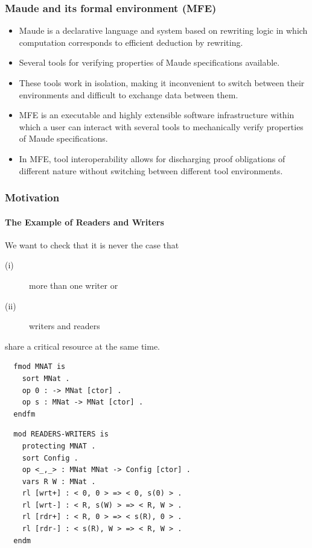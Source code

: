 \documentclass[xcolor=dvipsnames,10pt]{beamer}
\newcommand{\enfa}[1]{{\color{Red}#1}}
\begin{document}
\begin{frame}
  \frametitle{Maude and its formal environment (MFE)}

  \begin{itemize}
    \item Maude is a declarative language and system based on 
rewriting logic in which computation
corresponds to efficient deduction by rewriting.

    \item Several tools for verifying properties of Maude specifications available.

    \item These tools work in isolation, 
making it inconvenient to switch between their environments
and difficult to exchange data between them.

    \item MFE is
an executable and \enfa{highly extensible} software infrastructure
within which a user can \enfa{interact} with several 
tools to mechanically verify properties of Maude specifications.

    \item In MFE, tool \enfa{interoperability} allows for discharging proof obligations
of different nature without switching between different
tool environments.
  \end{itemize}
\end{frame}


\begin{frame}[fragile]
  \frametitle{Motivation}
  \framesubtitle{The Example of Readers and Writers}

We want to check that it is never the case that
  	\begin{description}
	\item[(i)] more than one writer or 
	\item[(ii)] writers and readers 
	\end{description}
share a critical resource at the same time. 

\bigskip

\begin{minipage}{0.45\linewidth}
{
\scriptsize
\begin{verbatim}
  fmod MNAT is
    sort MNat .
    op 0 : -> MNat [ctor] .
    op s : MNat -> MNat [ctor] .
  endfm 
\end{verbatim}
}
\end{minipage}
\begin{minipage}{0.45\linewidth}
{
\scriptsize
\begin{verbatim}
  mod READERS-WRITERS is
    protecting MNAT .
    sort Config .
    op <_,_> : MNat MNat -> Config [ctor] .
    vars R W : MNat .
    rl [wrt+] : < 0, 0 > => < 0, s(0) > .
    rl [wrt-] : < R, s(W) > => < R, W > .
    rl [rdr+] : < R, 0 > => < s(R), 0 > .
    rl [rdr-] : < s(R), W > => < R, W > .
  endm 
\end{verbatim}
}
\end{minipage}
\end{frame}
\end{document}
